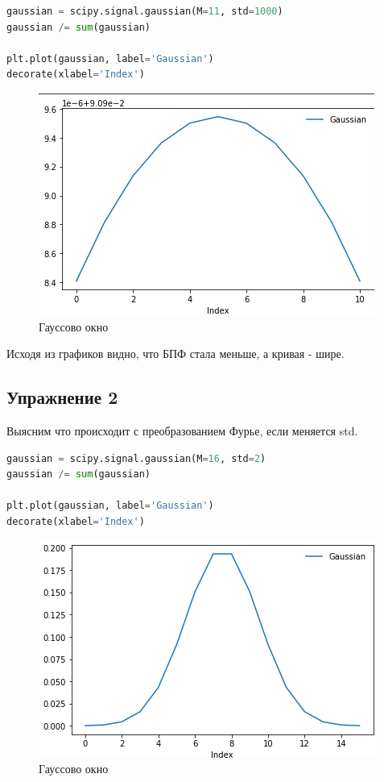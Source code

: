 \begin{lstlisting}[language=Python]
gaussian = scipy.signal.gaussian(M=11, std=1000)
gaussian /= sum(gaussian)

plt.plot(gaussian, label='Gaussian')
decorate(xlabel='Index')
\end{lstlisting}
\begin{figure}[H]
	\begin{center}
		\includegraphics[scale=0.7]{fig/lab08/lab8_3.png}
		\caption{Гауссово окно}
	\end{center}
\end{figure}

Исходя из графиков видно, что БПФ стала меньше, а кривая - шире.

\subsection{Упражнение 2}

Выясним что происходит с преобразованием Фурье, если меняется std.

\begin{lstlisting}[language=Python]
gaussian = scipy.signal.gaussian(M=16, std=2)
gaussian /= sum(gaussian)

plt.plot(gaussian, label='Gaussian')
decorate(xlabel='Index')
\end{lstlisting}
\begin{figure}[H]
	\begin{center}
		\includegraphics[scale=0.7]{fig/lab08/lab8_4.png}
		\caption{Гауссово окно}
	\end{center}
\end{figure}

